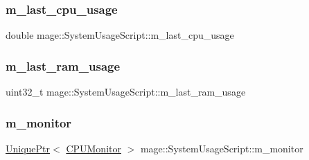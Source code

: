 \subsubsection{\texorpdfstring{m\+\_\+last\+\_\+cpu\+\_\+usage}{m\_last\_cpu\_usage}}
{\footnotesize\ttfamily double mage\+::\+System\+Usage\+Script\+::m\+\_\+last\+\_\+cpu\+\_\+usage\hspace{0.3cm}{\ttfamily [private]}}

\hypertarget{classmage_1_1_system_usage_script_a64538d152d33546516a6acdda939b619}{}\label{classmage_1_1_system_usage_script_a64538d152d33546516a6acdda939b619} 
\subsubsection{\texorpdfstring{m\+\_\+last\+\_\+ram\+\_\+usage}{m\_last\_ram\_usage}}
{\footnotesize\ttfamily uint32\+\_\+t mage\+::\+System\+Usage\+Script\+::m\+\_\+last\+\_\+ram\+\_\+usage\hspace{0.3cm}{\ttfamily [private]}}

\hypertarget{classmage_1_1_system_usage_script_a45574bef4a526bdd99108e92bf12dcbd}{}\label{classmage_1_1_system_usage_script_a45574bef4a526bdd99108e92bf12dcbd} 
\subsubsection{\texorpdfstring{m\+\_\+monitor}{m\_monitor}}
{\footnotesize\ttfamily \hyperlink{namespacemage_a8c307fbcc33bce9b7f2aa4c26c3b95cf}{Unique\+Ptr}$<$ \hyperlink{classmage_1_1_c_p_u_monitor}{C\+P\+U\+Monitor} $>$ mage\+::\+System\+Usage\+Script\+::m\+\_\+monitor\hspace{0.3cm}{\ttfamily [private]}}

\hypertarget{classmage_1_1_system_usage_script_af6dd5e39889458ffb042f1d13fbcd7ea}{}\label{classmage_1_1_system_usage_script_af6dd5e39889458ffb042f1d13fbcd7ea} 
